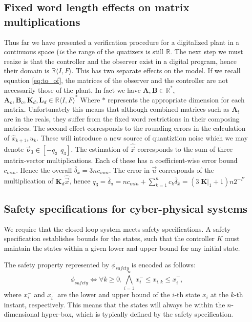 \documentclass[runningheads,a4paper]{llncs}
\newcommand{\todo}[1]{{\color{red} TODO: #1}}
\newcommand{\mat}[1]{\boldsymbol{#1}}
\begin{document}
\subsection{Fixed word length effects on matrix multiplications}
\label{sec:cof_fwl}
Thus far we have presented a verification procedure for a digitalized plant in a continuous space (\emph{ie} the
range of the quatizers is still $\mathbb{R}$. The next step we must reaize is that the controller and the observer
exist in a digital program, hence their domain is $\mathbb{R}\langle I,F\rangle$. This has two separate effects
on the model. If we recall equation \eqref{eq:to_of}, the matrices of the observer and the controller  are not necessarily those of the plant.
In fact we have $\mat{A},\mat{B} \in \mathbb{R}^*$, $\mat{A}_o,\mat{B}_o,\mat{K}_d, \mat{L}_d \in \mathbb{R}\langle I,F\rangle^*$
Where $*$ represents the appropriate dimension for each matrix.
Unfortunately this means that although combined matrices such as $\mat{A}_t$ are in the reals, they suffer from
the fixed word restrictions in their composing matrices.
The second effect corresponds to the rounding errors in the calculation of $\hat{x}_{k+1}, u_k$. These will introduce a new source of quantiztion noise which we may denote $\vec{\nu}_3 \in [-q_3\ \ q_3]$.
The estimation of $\hat{\vec{x}}$ corresponds to the sum of three matrix-vector multiplications. Each of these has a coefficient-wise error bound $c_{min}$. Hence the overall $\overline{\delta}_{\hat{x}}=3nc_{min}$. The error in $\vec{u}$ corresponds of the multiplication of $\mat{K}_d\hat{\vec{x}}$, hence $q_3=\overline{\delta}_u=nc_{min}+\sum_{k=1}^nc_k\overline{\delta}_{\hat{x}}=(3|\mat{K}|_1+1)n2^{-F}$


\subsection{Safety specifications for cyber-physical systems}
\label{ssec:safety}

We require that the closed-loop system meets safety specifications. 
A safety specification establishes bounds for the states, such that 
the controller $K$ must maintain the states within a given lower and upper 
bound for any initial state. 

The safety property represented by $\phi_{safety}$ is encoded as follows:
%
\begin{equation}
\label{eq:safetyliteral}
\phi_{safety}\iff \forall k\geq 0, \bigwedge_{i=1}^{n}{x_{i}^{-} \leq x_{i,k} \leq x_{i}^{+}},
\end{equation}
%
where $x_{i}^{-}$ and $x_{i}^{+}$ are the lower and upper bound 
of the $i$-th state $x_{i}$ at the $k$-th instant, respectively.
This means that the states will always be within the $n$-dimensional 
hyper-box, which is typically defined by the safety specification.
\end{document}
